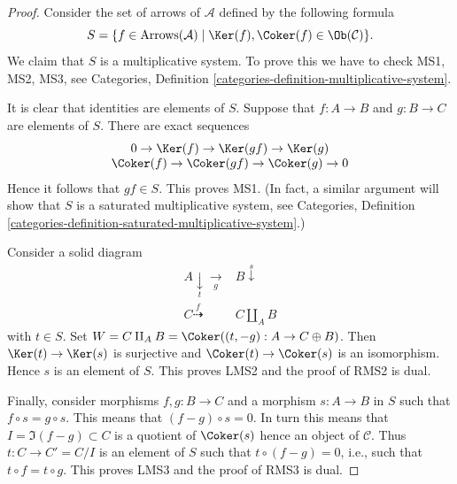 \begin{proof}

Consider the set of arrows of $\mathcal{A}$ defined by
the following formula
$$
S = \{f \in \text{Arrows}(\mathcal{A}) \mid
\Ker(f), \Coker(f) \in \Ob(\mathcal{C}) \}.
$$
We claim that $S$ is a multiplicative system. To prove this we have
to check MS1, MS2, MS3, see
Categories, Definition \ref{categories-definition-multiplicative-system}.

\medskip\noindent
It is clear that identities are elements of $S$. Suppose that
$f : A \to B$ and $g : B \to C$ are elements of $S$.
There are exact sequences
$$
\begin{matrix}
0 \to \Ker(f) \to \Ker(gf) \to \Ker(g) \\
\Coker(f) \to \Coker(gf) \to \Coker(g) \to 0
\end{matrix}
$$
Hence it follows that $gf \in S$. This proves MS1. (In fact, a similar
argument will show that $S$ is a saturated multiplicative system, see
Categories, Definition
\ref{categories-definition-saturated-multiplicative-system}.)

\medskip\noindent
Consider a solid diagram
$$
\begin{array}{cc}A \underset{t}{\downarrow}\underset{g}{\longrightarrow} & B \overset{s}{\downarrow} \\ C \overset{f}{\dashrightarrow} & C \amalg_A B\end{array}
$$
with $t \in S$. Set
$W = C \amalg_A B =  \Coker((t, -g) : A \to C \oplus B)$.
Then $\Ker(t) \to \Ker(s)$ is surjective and
$\Coker(t) \to \Coker(s)$ is an isomorphism. Hence
$s$ is an element of $S$. This proves LMS2 and the proof of RMS2 is dual.

\medskip\noindent
Finally, consider morphisms $f, g : B \to C$ and a morphism $s : A \to B$
in $S$ such that $f \circ s = g \circ s$. This means that
$(f - g) \circ s = 0$. In turn this means that
$I = \Im(f - g) \subset C$ is a quotient of $\Coker(s)$
hence an object of $\mathcal{C}$. Thus $t : C \to C' = C/I$ is an
element of $S$ such that $t \circ (f - g) = 0$, i.e., such that
$t \circ f = t \circ g$. This proves LMS3 and the proof of
RMS3 is dual.


\end{proof}
